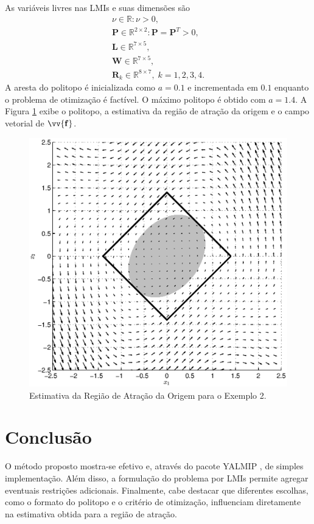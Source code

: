 \documentclass{ppgeesa}
\newcommand*{\Bold}[1]{\boldsymbol{\mathbf{#1}}}
\newcommand*{\Matr}[1]{\Bold{#1}}
\newcommand*{\Vect}[1]{\vv{\Bold{#1}}}
\begin{document}
As variáveis livres nas LMIs e suas dimensões são
\begin{gather}
  \nu \in \mathbb{R} \colon \nu > 0
  ,\\
  \Matr{P} \in \mathbb{R}^{2 \times 2} \colon \Matr{P} = \Matr{P}^T > 0
  ,\\
  \Matr{L} \in \mathbb{R}^{7 \times 5}
  ,\\
  \Matr{W} \in \mathbb{R}^{7 \times 5}
  ,\\
  \Matr{R}_k \in \mathbb{R}^{8 \times 7}
  ,\; k = 1, 2, 3, 4
  .
\end{gather}
A aresta do politopo é inicializada como $a = \num{0.1}$ e incrementada em $\num{0.1}$ enquanto o problema de otimização é factível.
O máximo politopo é obtido com $a = \num{1.4}$.
A Figura \ref{fig:rao2} exibe o politopo, a estimativa da região de atração da origem e o campo vetorial de $\Vect{f}$.

\begin{figure}[h]
  \centering
  \includegraphics[width=0.95\linewidth]{exemplo2_13.eps}
  \caption{Estimativa da Região de Atração da Origem para o Exemplo 2.}
  \label{fig:rao2}
\end{figure}

\section{Conclusão}
O método proposto mostra-se efetivo e, através do pacote YALMIP \cite{proceedings:Lofberg2004}, de simples implementação.
Além disso, a formulação do problema por LMIs permite agregar eventuais restrições adicionais.
Finalmente, cabe destacar que diferentes escolhas, como o formato do politopo e o critério de otimização, influenciam diretamente na estimativa obtida para a região de atração.



\end{document}
